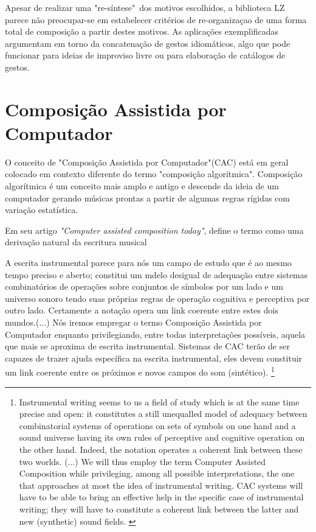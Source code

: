 \documentclass[
	12pt,				%
	openright,			%
	twoside,			%
	a4paper,			%
	english,			%
	french,				%
	spanish,			%
	brazil				%
	]{abntex2}
\begin{document}
Apesar de realizar uma "re-síntese"\ dos motivos escolhidos, a biblioteca LZ parece não preocupar-se em estabelecer critérios de re-organizaçao de uma forma total de composição a partir destes motivos. As aplicações exemplificadas argumentam em torno da concatenação de gestos idiomáticos, algo que pode funcionar para ideias de improviso livre ou para elaboração de catálogos de gestos. 





\chapter{Composição Assistida por Computador}
\label{cac}

O conceito de "Composição Assistida por Computador"(CAC) está em geral colocado em contexto diferente do termo "composição algorítmica". Composição algorítmica é um conceito mais amplo e antigo e descende da ideia de um computador gerando músicas prontas a partir de algumas regras rígidas com variação estatística.

Em seu artigo \textit{"Computer assisted composition today"},  define o termo como uma derivação natural da escritura musical

\begin{citacao}
A escrita instrumental parece para nós um campo de estudo que é ao mesmo tempo preciso e aberto; constitui um mdelo desigual de adequação entre sistemas combinatórios de operações sobre conjuntos de símbolos por um lado e um universo sonoro tendo suas próprias regras  de operação cognitiva e perceptiva por outro lado. Certamente a notação opera um link coerente entre estes dois mundos.(...)
Nós iremos empregar o termo Composição Assistida por Computador enquanto privilegiando, entre todas interpretações possíveis, aquela que mais se aproxima de escrita instrumental. Sistemas de CAC terão de ser capazes de trazer ajuda específica na escrita instrumental, eles devem constituir um link coerente entre os próximos e novos campos do som (sintético). \cite[p. 07]{assayag1999computer} \footnote{
Instrumental writing seems to us a field of study which is at the same time precise and open: it constitutes a still unequalled model of adequacy between combinatorial systems of operations on sets of symbols on one hand and a sound universe having its own rules of perceptive and cognitive operation on the other hand. Indeed, the notation operates a coherent link between these two worlds. (...) We will thus employ the term Computer Assisted Composition while privileging, among all possible interpretations, the one that approaches at most the idea of instrumental writing. CAC systems will have to be able to bring an effective help in the specific case of instrumental writing; they will have to constitute a coherent link between the latter and new (synthetic) sound fields. \cite[p. 07]{assayag1999computer}}
\end{citacao}
\end{document}
